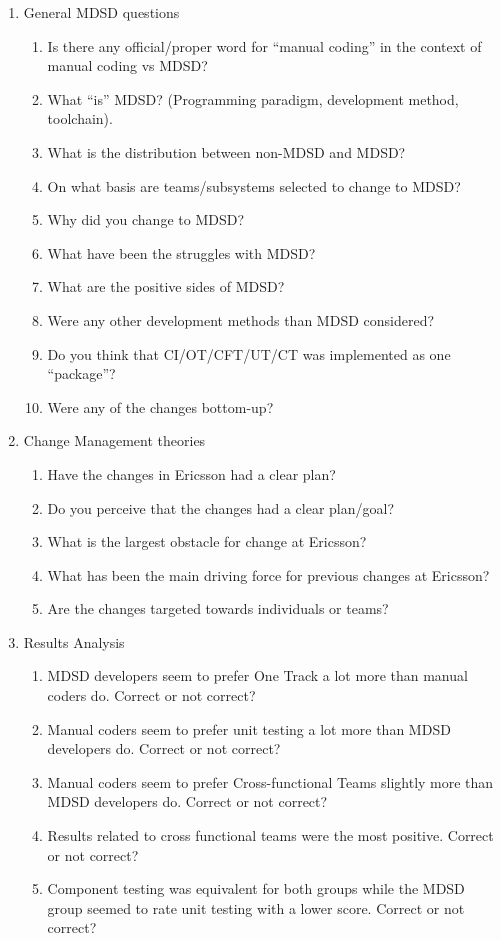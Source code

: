 \documentclass[final_report_innit.tex]{subfiles}
\begin{document}
\begin{enumerate}
	\item General MDSD questions
	\begin{enumerate}
		\item Is there any official/proper word for ``manual coding'' in the context of manual coding vs MDSD?
		\item What ``is'' MDSD? (Programming paradigm, development method, toolchain).
		\item What is the distribution between non-MDSD and MDSD?
		\item On what basis are teams/subsystems selected to change to MDSD?
		\item Why did you change to MDSD?
		\item What have been the struggles with MDSD?
		\item What are the positive sides of MDSD?
		\item Were any other development methods than MDSD considered?
		\item Do you think that CI/OT/CFT/UT/CT was implemented as one ``package''?
		\item Were any of the changes bottom-up?
	\end{enumerate}
	\item Change Management theories
	\begin{enumerate}
		\item Have the changes in Ericsson had a clear plan? 
		\item Do you perceive that the changes had a clear plan/goal?
		\item What is the largest obstacle for change at Ericsson?
		\item What has been the main driving force for previous changes at Ericsson?
		\item Are the changes targeted towards individuals or teams?
	\end{enumerate}
	\item Results Analysis
	\begin{enumerate}
		\item MDSD developers seem to prefer One Track a lot more than manual coders do. Correct or not correct?
		\item Manual coders seem to prefer unit testing a lot more than MDSD developers do. Correct or not correct?
		\item Manual coders seem to prefer Cross-functional Teams slightly more than MDSD developers do. Correct or not correct?
		\item Results related to cross functional teams were the most positive. Correct or not correct?
		\item Component testing was equivalent for both groups while the MDSD group seemed to rate unit testing with a lower score. Correct or not correct?
	\end{enumerate}
\end{enumerate}
\end{document}
